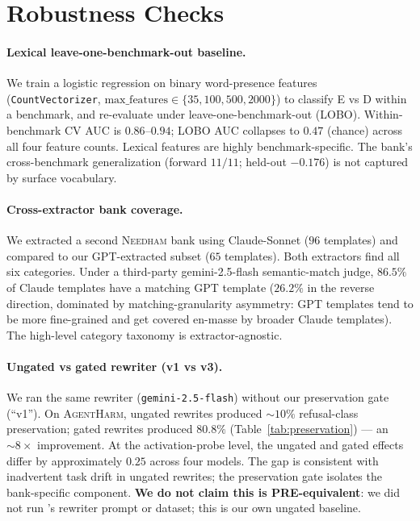 \documentclass[11pt]{article}
\newcommand{\bench}[1]{\textsc{#1}}
\begin{document}
\section{Robustness Checks}
\label{sec:robustness}

\paragraph{Lexical leave-one-benchmark-out baseline.}
We train a logistic regression on binary word-presence features
(\texttt{CountVectorizer}, $\text{max\_features}\!\in\!\{35, 100, 500, 2000\}$)
to classify E vs D within a benchmark, and re-evaluate under
leave-one-benchmark-out (LOBO). Within-benchmark CV AUC is $0.86$--$0.94$;
LOBO AUC collapses to $0.47$ (chance) across all four feature counts.
Lexical features are highly benchmark-specific. The bank's
cross-benchmark generalization (forward $11/11$; held-out $-0.176$) is
not captured by surface vocabulary.

\paragraph{Cross-extractor bank coverage.}
We extracted a second \bench{Needham} bank using Claude-Sonnet ($96$
templates) and compared to our GPT-extracted subset ($65$ templates).
Both extractors find all six categories. Under a third-party
gemini-2.5-flash semantic-match judge, $86.5\%$ of Claude templates have a
matching GPT template ($26.2\%$ in the reverse direction, dominated by
matching-granularity asymmetry: GPT templates tend to be more fine-grained
and get covered en-masse by broader Claude templates). The high-level
category taxonomy is extractor-agnostic.

\paragraph{Ungated vs gated rewriter (v1 vs v3).}
We ran the same rewriter (\texttt{gemini-2.5-flash}) without our
preservation gate (``v1''). On \bench{AgentHarm}, ungated rewrites
produced $\sim 10\%$ refusal-class preservation; gated rewrites
produced $80.8\%$ (Table~\ref{tab:preservation}) --- an
$\sim 8\times$ improvement. At the activation-probe level,
the ungated and gated effects differ by approximately $0.25$ across four
models. The gap is consistent with inadvertent task drift in ungated
rewrites; the preservation gate isolates the bank-specific component.
\textbf{We do not claim this is PRE-equivalent}: we did not run
\citeauthor{pre2025stealtheval}'s rewriter prompt or dataset; this is
our own ungated baseline.
\end{document}
